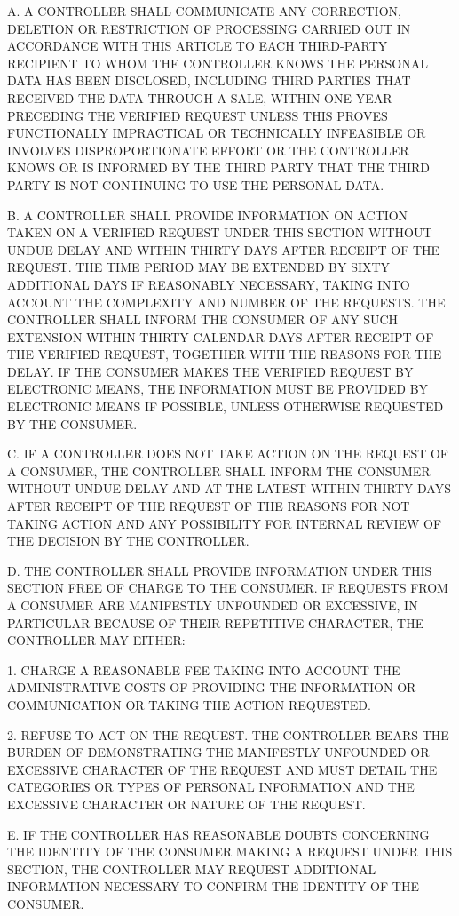 A. A CONTROLLER SHALL COMMUNICATE ANY CORRECTION, DELETION OR RESTRICTION OF PROCESSING CARRIED OUT IN ACCORDANCE WITH THIS ARTICLE TO EACH THIRD-PARTY RECIPIENT TO WHOM THE CONTROLLER KNOWS THE PERSONAL DATA HAS BEEN DISCLOSED, INCLUDING THIRD PARTIES THAT RECEIVED THE DATA THROUGH A SALE, WITHIN ONE YEAR PRECEDING THE VERIFIED REQUEST UNLESS THIS PROVES FUNCTIONALLY IMPRACTICAL OR TECHNICALLY INFEASIBLE OR INVOLVES DISPROPORTIONATE EFFORT OR THE CONTROLLER KNOWS OR IS INFORMED BY THE THIRD PARTY THAT THE THIRD PARTY IS NOT CONTINUING TO USE THE PERSONAL DATA.

B. A CONTROLLER SHALL PROVIDE INFORMATION ON ACTION TAKEN ON A VERIFIED REQUEST UNDER THIS SECTION WITHOUT UNDUE DELAY AND WITHIN THIRTY DAYS AFTER RECEIPT OF THE REQUEST. THE TIME PERIOD MAY BE EXTENDED BY SIXTY ADDITIONAL DAYS IF REASONABLY NECESSARY, TAKING INTO ACCOUNT THE COMPLEXITY AND NUMBER OF THE REQUESTS. THE CONTROLLER SHALL INFORM THE CONSUMER OF ANY SUCH EXTENSION WITHIN THIRTY CALENDAR DAYS AFTER RECEIPT OF THE VERIFIED REQUEST, TOGETHER WITH THE REASONS FOR THE DELAY. IF THE CONSUMER MAKES THE VERIFIED REQUEST BY ELECTRONIC MEANS, THE INFORMATION MUST BE PROVIDED BY ELECTRONIC MEANS IF POSSIBLE, UNLESS OTHERWISE REQUESTED BY THE CONSUMER.

C. IF A CONTROLLER DOES NOT TAKE ACTION ON THE REQUEST OF A CONSUMER, THE CONTROLLER SHALL INFORM THE CONSUMER WITHOUT UNDUE DELAY AND AT THE LATEST WITHIN THIRTY DAYS AFTER RECEIPT OF THE REQUEST OF THE REASONS FOR NOT TAKING ACTION AND ANY POSSIBILITY FOR INTERNAL REVIEW OF THE DECISION BY THE CONTROLLER.

D. THE CONTROLLER SHALL PROVIDE INFORMATION UNDER THIS SECTION FREE OF CHARGE TO THE CONSUMER. IF REQUESTS FROM A CONSUMER ARE MANIFESTLY UNFOUNDED OR EXCESSIVE, IN PARTICULAR BECAUSE OF THEIR REPETITIVE CHARACTER, THE CONTROLLER MAY EITHER:

1. CHARGE A REASONABLE FEE TAKING INTO ACCOUNT THE ADMINISTRATIVE COSTS OF PROVIDING THE INFORMATION OR COMMUNICATION OR TAKING THE ACTION REQUESTED.

2. REFUSE TO ACT ON THE REQUEST. THE CONTROLLER BEARS THE BURDEN OF DEMONSTRATING THE MANIFESTLY UNFOUNDED OR EXCESSIVE CHARACTER OF THE REQUEST AND MUST DETAIL THE CATEGORIES OR TYPES OF PERSONAL INFORMATION AND THE EXCESSIVE CHARACTER OR NATURE OF THE REQUEST.

E. IF THE CONTROLLER HAS REASONABLE DOUBTS CONCERNING THE IDENTITY OF THE CONSUMER MAKING A REQUEST UNDER THIS SECTION, THE CONTROLLER MAY REQUEST ADDITIONAL INFORMATION NECESSARY TO CONFIRM THE IDENTITY OF THE CONSUMER.

